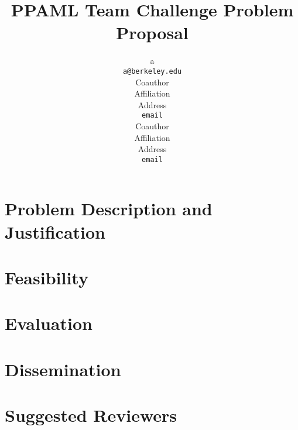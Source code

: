 \documentclass{article} %
\title{PPAML Team Challenge Problem Proposal}
\author{
a \\
\texttt{a@berkeley.edu} \\
\And
Coauthor \\
Affiliation \\
Address \\
\texttt{email} \\
\AND
Coauthor \\
Affiliation \\
Address \\
\texttt{email} \\
}
\begin{document}
\maketitle

\section{Problem Description and Justification}


\section{Feasibility}


\section{Evaluation}


\section{Dissemination}


\section{Suggested Reviewers}



{\small


}
\end{document}
